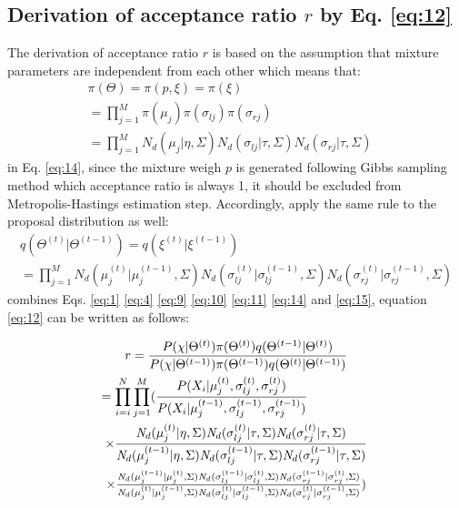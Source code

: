 \documentclass[conference]{IEEEtran}
\begin{document}
\subsection{Derivation of acceptance ratio $r$ by Eq. \eqref{eq:12}}
The derivation of acceptance ratio $r$ is based on the assumption that mixture parameters are independent from each other which means that:
\begin{multline}
\pi(\Theta) = \pi(p,\xi) = \pi(\xi) \\
= \prod_{j=1}^M\pi(\mu_j)\pi(\sigma_{lj})\pi(\sigma_{rj})\qquad\qquad\qquad\qquad \\
= \prod_{j=1}^M\textit{N}_d(\mu_j|\eta,\Sigma)\textit{N}_d(\sigma_{lj}|\tau,\Sigma)\textit{N}_d(\sigma_{rj}|\tau,\Sigma)\quad
\label{eq:13}
\end{multline}
in Eq. \eqref{eq:14}, since the mixture weigh $p$ is generated following Gibbs sampling method which acceptance ratio is always 1, it should be excluded from Metropolis-Hastings estimation step. Accordingly, apply the same rule to the proposal distribution as well:
\begin{multline}
q(\Theta^{(t)}|\Theta^{(t-1)}) = q(\xi^{(t)}|\xi^{(t-1)}) \\
= \prod_{j=1}^M\textit{N}_d(\mu_j^{(t)}|\mu_j^{(t-1)},\Sigma)\textit{N}_d(\sigma_{lj}^{(t)}|\sigma_{lj}^{(t-1)},\Sigma)\textit{N}_d(\sigma_{rj}^{(t)}|\sigma_{rj}^{(t-1)},\Sigma)
\label{eq:14}
\end{multline}
combines Eqs. \eqref{eq:1} \eqref{eq:4} \eqref{eq:9} \eqref{eq:10} \eqref{eq:11} \eqref{eq:14} and \eqref{eq:15}, equation \eqref{eq:12} can be written as follows:

\begin{multline}
r = \frac{P(\chi|\Theta^{(t)})\pi(\Theta^{(t)})q(\Theta^{(t-1)}|\Theta^{(t)})}{P(\chi|\Theta^{(t-1)})\pi(\Theta^{(t-1)})q(\Theta^{(t)}|\Theta^{(t-1)})} \\
= \prod_{i=i}^N \prod_{j=1}^M(\frac{P(X_i|\mu_j^{(t)},\sigma_{lj}^{(t)},\sigma_{rj}^{(t)})}
{P(X_i|\mu_j^{(t-1)},\sigma_{lj}^{(t-1)},\sigma_{rj}^{(t-1)})} \qquad\qquad\quad \\
\times \frac{\textit{N}_d(\mu_j^{(t)}|\eta,\Sigma)\textit{N}_d(\sigma_{lj}^{(t)}|\tau,\Sigma)\textit{N}_d(\sigma_{rj}^{(t)}|\tau,\Sigma)}{\textit{N}_d(\mu_j^{(t-1)}|\eta,\Sigma)\textit{N}_d(\sigma_{lj}^{(t-1)}|\tau,\Sigma)\textit{N}_d(\sigma_{rj}^{(t-1)}|\tau,\Sigma)} \\
\times \scalebox{1.01}{$\frac{\textit{N}_d(\mu_j^{(t-1)}|\mu_j^{(t)},\Sigma)\textit{N}_d(\sigma_{lj}^{(t-1)}|\sigma_{lj}^{(t)},\Sigma)\textit{N}_d(\sigma_{rj}^{(t-1)}|\sigma_{rj}^{(t)},\Sigma)}{\textit{N}_d(\mu_j^{(t)}|\mu_j^{(t-1)},\Sigma)\textit{N}_d(\sigma_{lj}^{(t)}|\sigma_{lj}^{(t-1)},\Sigma)\textit{N}_d(\sigma_{rj}^{(t)}|\sigma_{rj}^{(t-1)},\Sigma)}$})
\label{eq:15}
\end{multline}
\end{document}

